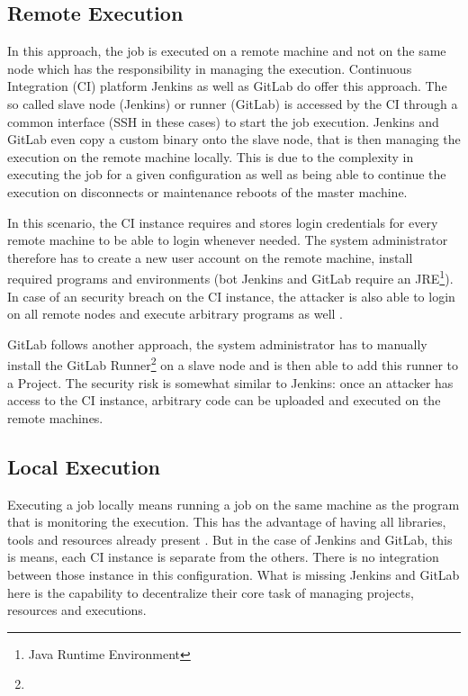 \subsection{Remote Execution}

In this approach, the job is executed on a remote machine and not on the same node which has the responsibility in managing the execution.
Continuous Integration (CI) platform Jenkins\cite{jenkins:main} as well as GitLab\cite{gitlab:main} do offer this approach.
The so called slave node (Jenkins) or runner (GitLab) is accessed by the CI through a common interface (SSH in these cases) to start the job execution.
Jenkins and GitLab even copy a custom binary onto the slave node, that is then managing the execution on the remote machine locally.
This is due to the complexity in executing the job for a given configuration as well as being able to continue the execution on disconnects or maintenance reboots of the master machine.

In this scenario, the CI instance requires and stores login credentials for every remote machine to be able to login whenever needed.
The system administrator therefore has to create a new user account on the remote machine, install required programs and environments (bot Jenkins and GitLab require an JRE\footnote{Java Runtime Environment}).
In case of an security breach on the CI instance, the attacker is also able to login on all remote nodes and execute arbitrary programs as well .


GitLab follows another approach, the system administrator has to manually install the GitLab Runner\footnote{} on a slave node and is then able to add this runner to a Project.
The security risk is somewhat similar to Jenkins: once an attacker has access to the CI instance, arbitrary code can be uploaded and executed on the remote machines. 


\subsection{Local Execution}

Executing a job locally means running a job on the same machine as the program that is monitoring the execution.
This has the advantage of having all libraries, tools and resources already present .
But in the case of Jenkins and GitLab, this is means, each CI instance is separate from the others.
There is no integration between those instance in this configuration.
What is missing Jenkins and GitLab here is the capability to decentralize their core task of managing projects, resources and executions.

